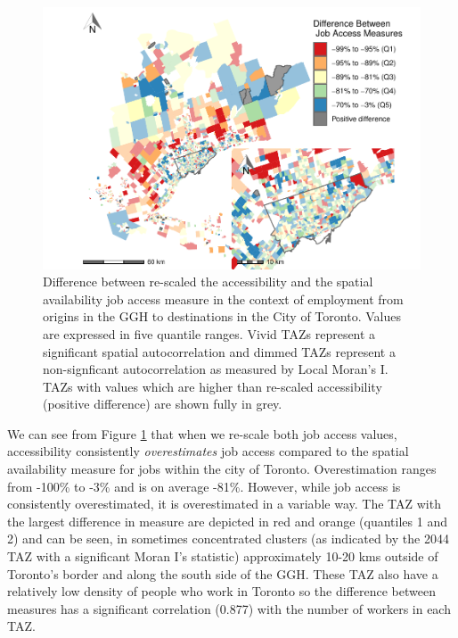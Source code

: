 \documentclass[]{elsarticle} %
\begin{document}
\begin{figure}
\includegraphics[width=1\linewidth]{Spatial-Availability_files/figure-latex/plot-local-i-Toronto-1} \caption{\label{fig:plot-local-i-Toronto}Difference between re-scaled the accessibility and the spatial availability job access measure in the context of employment from origins in the GGH to destinations in the City of Toronto. Values are expressed in five quantile ranges. Vivid TAZs represent a significant spatial autocorrelation and dimmed TAZs represent a non-signficant autocorrelation as measured by Local Moran's I. TAZs with values which are higher than re-scaled accessibility (positive difference) are shown fully in grey.}\label{fig:plot-local-i-Toronto}
\end{figure}

We can see from Figure \ref{fig:plot-local-i-Toronto} that when we
re-scale both job access values, accessibility consistently
\emph{overestimates} job access compared to the spatial availability
measure for jobs within the city of Toronto. Overestimation ranges from
-100\% to -3\% and is on average -81\%. However, while job access is
consistently overestimated, it is overestimated in a variable way. The
TAZ with the largest difference in measure are depicted in red and
orange (quantiles 1 and 2) and can be seen, in sometimes concentrated
clusters (as indicated by the 2044 TAZ with a significant Moran I's
statistic) approximately 10-20 kms outside of Toronto's border and along
the south side of the GGH. These TAZ also have a relatively low density
of people who work in Toronto so the difference between measures has a
significant correlation (0.877) with the number of workers in each TAZ.
\end{document}
